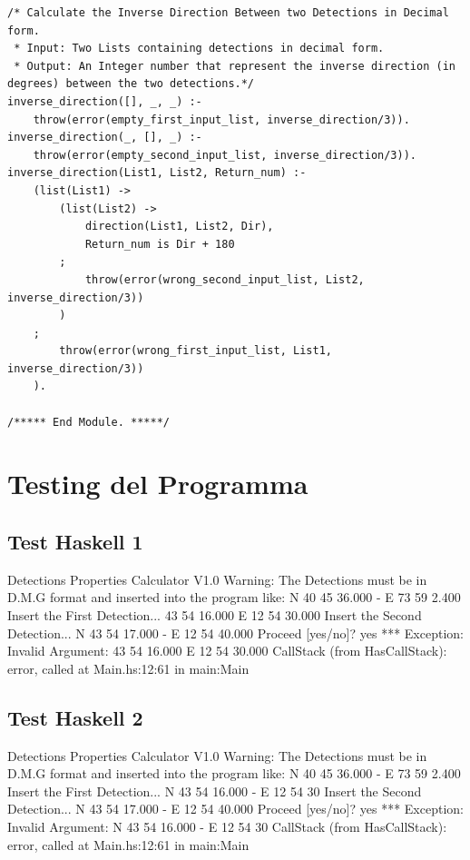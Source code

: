 \documentclass{article}
\begin{document}
\begin{lstlisting}
/* Calculate the Inverse Direction Between two Detections in Decimal form.
 * Input: Two Lists containing detections in decimal form.
 * Output: An Integer number that represent the inverse direction (in degrees) between the two detections.*/
inverse_direction([], _, _) :-
    throw(error(empty_first_input_list, inverse_direction/3)).
inverse_direction(_, [], _) :-
    throw(error(empty_second_input_list, inverse_direction/3)).
inverse_direction(List1, List2, Return_num) :-
    (list(List1) -> 
        (list(List2) -> 
            direction(List1, List2, Dir),
            Return_num is Dir + 180
        ;
            throw(error(wrong_second_input_list, List2, inverse_direction/3))
        )
    ;
        throw(error(wrong_first_input_list, List1, inverse_direction/3))
    ).
    
/***** End Module. *****/
\end{lstlisting}
\newpage

\section{Testing del Programma}
\subsection*{Test Haskell 1}
	\begin{spverbatim}
		Detections Properties Calculator V1.0 
		Warning: The Detections must be in D.M.G format and inserted into the program like: N 40 45 36.000 - E 73 59 2.400
		Insert the First Detection...
		43 54 16.000  E 12 54 30.000
		Insert the Second Detection...
		N 43 54 17.000 - E 12 54 40.000
		Proceed [yes/no]?
		yes
		*** Exception: Invalid Argument: 43 54 16.000  E 12 54 30.000
		CallStack (from HasCallStack):
		error, called at Main.hs:12:61 in main:Main
	\end{spverbatim}

\subsection*{Test Haskell 2}
	\begin{spverbatim}
		Detections Properties Calculator V1.0 
		Warning: The Detections must be in D.M.G format and inserted into the program like: N 40 45 36.000 - E 73 59 2.400
		Insert the First Detection...
		N 43 54 16.000 - E 12 54 30
		Insert the Second Detection...
		N 43 54 17.000 - E 12 54 40.000
		Proceed [yes/no]?
		yes
		*** Exception: Invalid Argument: N 43 54 16.000 - E 12 54 30
		CallStack (from HasCallStack):
		error, called at Main.hs:12:61 in main:Main
	\end{spverbatim}
\end{document}
